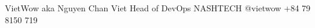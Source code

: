 %
%
%


\begin{referees}
		{VietWow aka Nguyen Chan Viet}
		{Head of DevOps}
		{NASHTECH}
		{@vietwow}
		{+84 79 8150 719}
\end{referees}